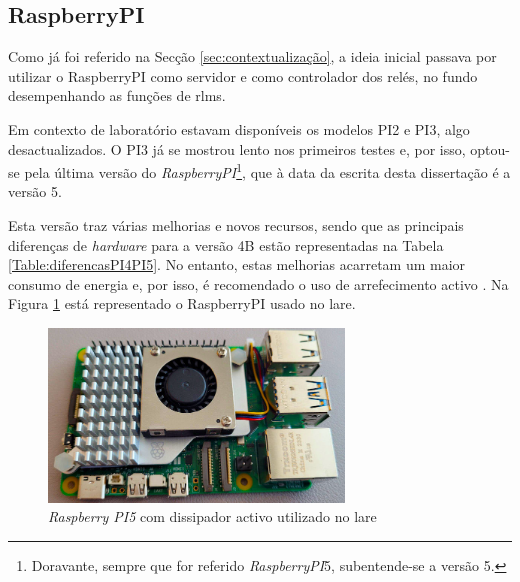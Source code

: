 \subsection{RaspberryPI}
\label{sec:RaspberryPI}
Como já foi referido na Secção \ref{sec:contextualização}, a ideia inicial passava por utilizar o \gls{RaspberryPI} como servidor e como controlador dos relés, no fundo desempenhando as funções de \acrshort{rlms}.

Em contexto de laboratório estavam disponíveis os modelos PI2 e PI3, algo desactualizados. O PI3 já se mostrou lento nos primeiros testes e, por isso, optou-se pela última versão do \textit{RaspberryPI}\footnote{Doravante, sempre que for referido \textit{RaspberryPI}5, subentende-se a versão 5.}, que à data da escrita desta dissertação é a versão 5.

Esta versão traz várias melhorias e novos recursos, sendo que as principais diferenças de \textit{hardware} para a versão 4B estão representadas na Tabela \ref{Table:diferencasPI4PI5}. No entanto, estas melhorias acarretam um maior consumo de energia e, por isso, é recomendado o uso de arrefecimento activo \cite{Raspberrytech}. Na Figura \ref{fig:pi5dissipador} está representado o \gls{RaspberryPI} usado no \acrshort{lare}.

\begin{figure}[hbtp]
	\centering
	\includegraphics[width=0.7\textwidth]{figures/pi5_dissipador.png}
	\caption{\textit{Raspberry PI5} com dissipador activo utilizado no \acrshort{lare}}
	\label{fig:pi5dissipador}
\end{figure}

